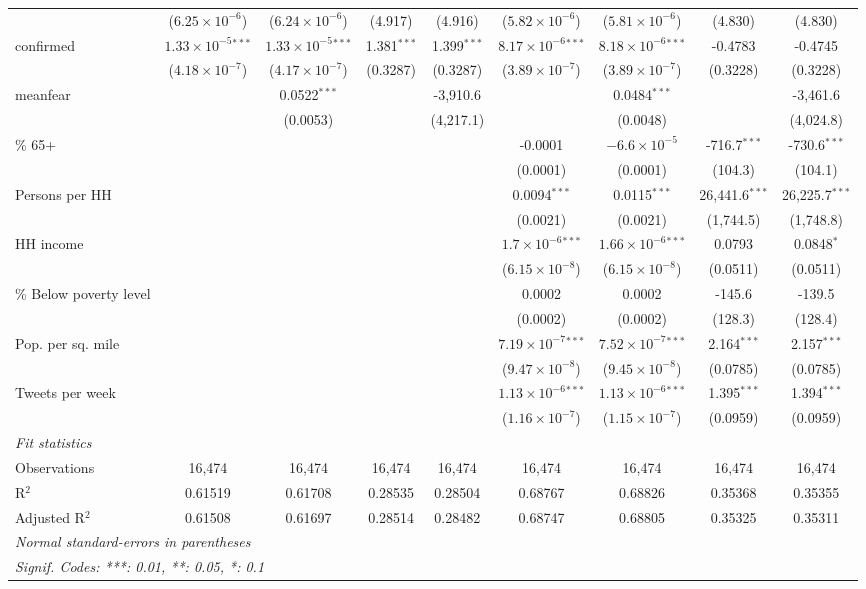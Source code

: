\documentclass{article}
\begin{document}
\begin{landscape}
\begin{table}
\begin{tabular}{lcccccccc}
    &($6.25\times 10^{-6}$) & ($6.24\times 10^{-6}$) & (4.917) & (4.916) & ($5.82\times 10^{-6}$) & ($5.81\times 10^{-6}$) & (4.830) & (4.830)\\
  confirmed&$1.33\times 10^{-5}$$^{***}$ & $1.33\times 10^{-5}$$^{***}$ & 1.381$^{***}$ & 1.399$^{***}$ & $8.17\times 10^{-6}$$^{***}$ & $8.18\times 10^{-6}$$^{***}$ & -0.4783 & -0.4745\\
    &($4.18\times 10^{-7}$) & ($4.17\times 10^{-7}$) & (0.3287) & (0.3287) & ($3.89\times 10^{-7}$) & ($3.89\times 10^{-7}$) & (0.3228) & (0.3228)\\
  meanfear&   & 0.0522$^{***}$ &    & -3,910.6 &    & 0.0484$^{***}$ &    & -3,461.6\\
    &   & (0.0053) &    & (4,217.1) &    & (0.0048) &    & (4,024.8)\\
    \% 65+&   &    &    &    & -0.0001 & $-6.6\times 10^{-5}$ & -716.7$^{***}$ & -730.6$^{***}$\\
    &   &    &    &    & (0.0001) & (0.0001) & (104.3) & (104.1)\\
  Persons per HH&   &    &    &    & 0.0094$^{***}$ & 0.0115$^{***}$ & 26,441.6$^{***}$ & 26,225.7$^{***}$\\
    &   &    &    &    & (0.0021) & (0.0021) & (1,744.5) & (1,748.8)\\
  HH income&   &    &    &    & $1.7\times 10^{-6}$$^{***}$ & $1.66\times 10^{-6}$$^{***}$ & 0.0793 & 0.0848$^{*}$\\
    &   &    &    &    & ($6.15\times 10^{-8}$) & ($6.15\times 10^{-8}$) & (0.0511) & (0.0511)\\
  \% Below poverty level&   &    &    &    & 0.0002 & 0.0002 & -145.6 & -139.5\\
    &   &    &    &    & (0.0002) & (0.0002) & (128.3) & (128.4)\\
  Pop. per sq. mile&   &    &    &    & $7.19\times 10^{-7}$$^{***}$ & $7.52\times 10^{-7}$$^{***}$ & 2.164$^{***}$ & 2.157$^{***}$\\
    &   &    &    &    & ($9.47\times 10^{-8}$) & ($9.45\times 10^{-8}$) & (0.0785) & (0.0785)\\
  Tweets per week&   &    &    &    & $1.13\times 10^{-6}$$^{***}$ & $1.13\times 10^{-6}$$^{***}$ & 1.395$^{***}$ & 1.394$^{***}$\\
    &   &    &    &    & ($1.16\times 10^{-7}$) & ($1.15\times 10^{-7}$) & (0.0959) & (0.0959)\\
  \midrule \emph{Fit statistics}&  & & & & & & & \\
  Observations & 16,474&16,474&16,474&16,474&16,474&16,474&16,474&16,474\\
  R$^2$ & 0.61519&0.61708&0.28535&0.28504&0.68767&0.68826&0.35368&0.35355\\
  Adjusted R$^2$ & 0.61508&0.61697&0.28514&0.28482&0.68747&0.68805&0.35325&0.35311\\
  \midrule\midrule\multicolumn{9}{l}{\emph{Normal standard-errors in parentheses}}\\
  \multicolumn{9}{l}{\emph{Signif. Codes: ***: 0.01, **: 0.05, *: 0.1}}\\
  \end{tabular}
\end{table}


\end{landscape}
\end{document}
